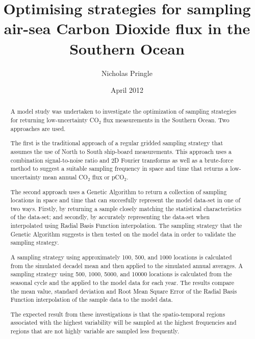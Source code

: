 \documentclass[11pt, a4paper]{article}
\numberwithin{figure}{section}
\numberwithin{table}{section}
\begin{document}
\title{Optimising strategies for sampling air-sea Carbon Dioxide flux in the 
       Southern Ocean}
\author{Nicholas Pringle}
\date{April 2012}
\maketitle
\newpage
 \newcommand{\specialcell}[2][c]{%
  \begin{tabular}[#1]{@{}l@{}l@{}}#2\end{tabular}}
  
\begin{abstract}
A model study was undertaken to investigate the optimization of 
sampling strategies for returning low-uncertainty CO$_2$ flux 
measurements in the Southern Ocean. Two approaches are used. 

The first is the traditional approach of a regular gridded sampling
strategy that assumes the use of North to South ship-board measurements. 
This approach uses a combination signal-to-noise ratio and 2D Fourier 
transforms as well as a brute-force method to suggest
a suitable sampling frequency in space and time that returns a 
low-uncertainty mean annual CO$_2$ flux or pCO$_2$.

The second approach uses a Genetic Algorithm to return a collection of 
sampling locations in space and time that can succesfully represent the 
model data-set in one of two ways. 
Firstly, by returning a sample closely matching the statistical 
characteristics of the data-set; and secondly, 
by accurately representing the data-set when interpolated using Radial 
Basis Function interpolation.
The sampling strategy that the Genetic Algorithm suggests is then tested on 
the model data in order to validate the sampling strategy. 

A sampling strategy using approximately 100, 500, and 1000 locations is 
calculated from the simulated decadel mean and then applied to the 
simulated annual averages.  
A sampling strategy using 500, 1000, 5000, and 10000 locations is 
calculated from the seasonal cycle and the applied to the model data for 
each year. 
The results compare the mean value, standard deviation and Root Mean Square
Error of the Radial Basis Function interpolation of the sample data to the
model data.

The expected result from these investigations is that the spatio-temporal 
regions associated with the highest variability will be sampled at the 
highest frequencies and regions that are not highly variable are sampled 
less frequently.  


\end{abstract}
\end{document}

